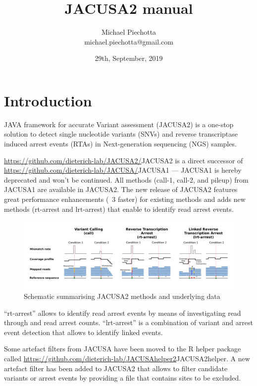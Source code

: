 \documentclass[10pt,a4paper]{article}
\title{JACUSA2 manual}
\author{Michael Piechotta \\ michael.piechotta@gmail.com}
\date{29th, September, 2019}
\begin{document}
\maketitle 
\tableofcontents
\listoftodos
\section{Introduction}
JAVA framework for accurate Variant assessment (JACUSA2) is a one-stop solution to detect single
nucleotide variants (SNVs) and reverse transcriptase induced arrest events (RTAs) in Next-generation 
sequencing (NGS) samples.

\url{https://github.com/dieterich-lab/JACUSA2/}{JACUSA2} is a direct successor of 
\url{https://github.com/dieterich-lab/JACUSA/}{JACUSA1} --- JACUSA1 is hereby deprecated and won't be 
continued. All methods (call-1, call-2, and pileup) from JACUSA1 are available in JACUSA2.
The new release of JACUSA2 features great performance enhancements (~3 faster) for existing methods 
and adds new methods (rt-arrest and lrt-arrest) that enable to identify read arrest events.

\begin{figure}[t]
	\centering
	\includegraphics[width=\textwidth]{figures/poster_jacusa_methods.pdf}
	\caption{Schematic summarising JACUSA2 methods and underlying data}
	\label{fig:methods}
\end{figure}

``rt-arrest'' allows to identify read arrest events by means of investigating read through and read
arrest counts. ``lrt-arrest'' is a combination of variant and arrest event detection that allows to 
identify linked events.

Some artefact filters from JACUSA have been moved to the R helper package called 
\url{https://github.com/dieterich-lab/JACUSAhelper2}{JACUSA2helper}.
A new artefact filter has been added to JACUSA2 that allows to filter candidate variants or arrest events 
by providing a file that contains sites to be excluded.
\end{document}
